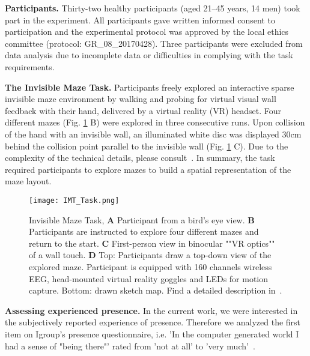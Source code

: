 \indent \textbf{Participants.} Thirty-two healthy participants (aged 21--45 years, 14 men) took part in the
experiment. All participants gave written informed consent to participation and the experimental protocol was approved by the local ethics committee (protocol: GR\_08\_20170428). Three participants were excluded from data analysis due to incomplete data or difficulties in complying with the task requirements.

\indent \textbf{The Invisible Maze Task.} Participants freely explored an interactive sparse invisible maze environment by walking and probing for virtual visual wall feedback with their hand, delivered by a virtual reality (VR) headset. Four different mazes (Fig. \ref{imt_task} B) were explored in three consecutive runs. Upon collision of the hand with an invisible wall, an illuminated white disc was displayed 30cm behind the collision point parallel to the invisible wall (Fig. \ref{imt_task} C). Due to the complexity of the technical details, please consult~\cite{gehrke2018}. In summary, the task required participants to explore mazes to build a spatial representation of the maze layout.%

\begin{figure}[h]
\centering
\texttt{[image: IMT\_Task.png]}
\vspace{0pt}
\caption{Invisible Maze Task, \textbf{A} Participant from a bird’s eye view. \textbf{B} Participants are instructed to explore four different mazes and return to the start. \textbf{C} First-person view in binocular ""VR optics"" of a wall touch. \textbf{D} Top: Participants draw a top-down view of the explored maze. Participant is equipped with 160 channels wireless EEG, head-mounted virtual reality goggles and LEDs for motion capture. Bottom: drawn sketch map. Find a detailed description in~\cite{gehrke2018}.}
\label{imt_task}
\end{figure}

\indent \textbf{Assessing experienced presence.} In the current work, we were interested in the subjectively reported experience of presence. Therefore we analyzed the first item on Igroup's presence questionnaire, i.e. 'In the computer generated world I had a sense of "being there"' rated from 'not at all' to 'very much'~\cite{ipq, slaterQ1}.

